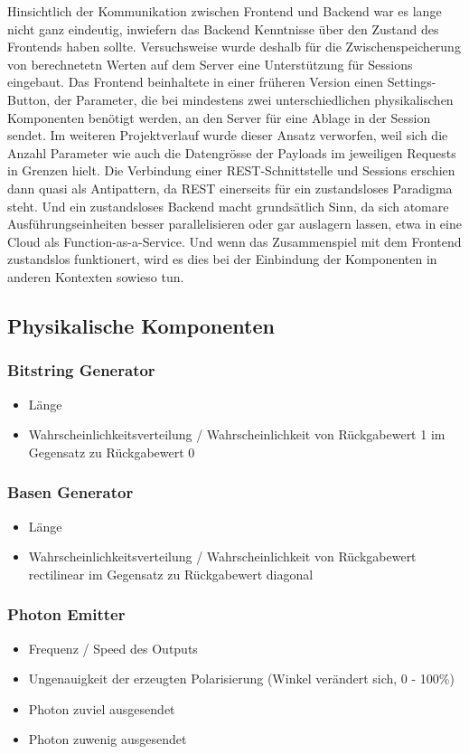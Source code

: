 \documentclass[a4paper,10.2pt,pdftex]{scrartcl}%
\begin{document}
Hinsichtlich der Kommunikation zwischen Frontend und Backend war es lange nicht ganz eindeutig, inwiefern das Backend Kenntnisse über den Zustand des Frontends haben sollte. Versuchsweise wurde deshalb für die Zwischenspeicherung von berechnetetn Werten auf dem Server eine Unterstützung für Sessions eingebaut. Das Frontend beinhaltete in einer früheren Version einen Settings-Button, der Parameter, die bei mindestens zwei unterschiedlichen physikalischen Komponenten benötigt werden, an den Server für eine Ablage in der Session sendet. Im weiteren Projektverlauf wurde dieser Ansatz verworfen, weil sich die Anzahl Parameter wie auch die Datengrösse der Payloads im jeweiligen Requests in Grenzen hielt. Die Verbindung einer REST-Schnittstelle und Sessions erschien dann quasi als Antipattern, da REST einerseits für ein zustandsloses Paradigma steht. Und ein zustandsloses Backend macht grundsätlich Sinn, da sich atomare Ausführungseinheiten besser parallelisieren oder gar auslagern lassen, etwa in eine Cloud als Function-as-a-Service. Und wenn das Zusammenspiel mit dem Frontend zustandslos funktionert, wird es dies bei der Einbindung der Komponenten in anderen Kontexten sowieso tun. 

\emph{}\subsection{Physikalische Komponenten}
\subsubsection*{ Bitstring Generator}
\begin{itemize}
\item Länge
\item  Wahrscheinlichkeitsverteilung / Wahrscheinlichkeit von Rückgabewert 1 im Gegensatz zu Rückgabewert 0
\end{itemize}
\subsubsection*{ Basen Generator}
\begin{itemize}
\item  Länge       
\item  Wahrscheinlichkeitsverteilung / Wahrscheinlichkeit von Rückgabewert rectilinear im Gegensatz zu Rückgabewert diagonal
\end{itemize}

\subsubsection*{ Photon Emitter}
\begin{itemize}
\item Frequenz / Speed des Outputs
\item  Ungenauigkeit der erzeugten Polarisierung (Winkel verändert sich, 0 - 100\%) 
\item  Photon zuviel ausgesendet
\item  Photon zuwenig ausgesendet
\end{itemize}
\end{document}
